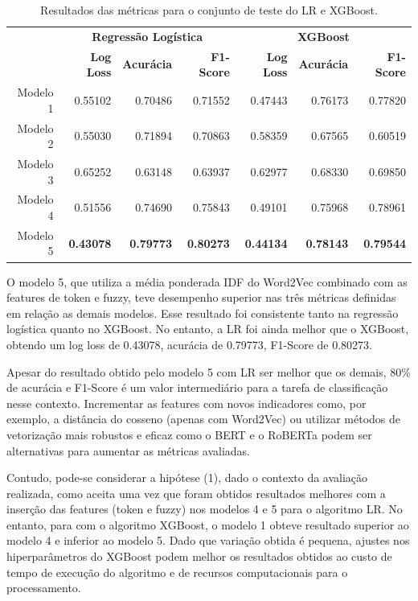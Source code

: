 \documentclass[conference]{IEEEtran}
\begin{document}
\begin{table}
\captionsetup{}
\caption{Resultados das métricas para o conjunto de teste do LR e XGBoost.} \label{tab:freq}
\setlength\tabcolsep{0pt} 
\footnotesize\centering
\centering
\begin{tabular*}{\textwidth}{@{\extracolsep{\stretch{1}}}*{7}{r}@{}}
  \toprule
   & \multicolumn{3}{c}{{\textbf{Regressão Logística}}}  &  \multicolumn{3}{c}{{\textbf{XGBoost}}} \\
   \cmidrule(lr){2-4}\cmidrule(l){5-7}
   & \textbf{Log Loss} & \textbf{Acurácia} & \textbf{F1-Score} & \textbf{Log Loss} & \textbf{Acurácia} & \textbf{F1-Score} \\
  \midrule
    Modelo 1 & 0.55102 & 0.70486 & 0.71552 & 0.47443 & 0.76173 & 0.77820 \\ 
    Modelo 2 & 0.55030 & 0.71894 & 0.70863 & 0.58359 & 0.67565 & 0.60519 \\
    Modelo 3 & 0.65252 & 0.63148 & 0.63937 & 0.62977 & 0.68330 & 0.69850 \\
    Modelo 4 & 0.51556 & 0.74690 & 0.75843 & 0.49101 & 0.75968 & 0.78961 \\
    Modelo 5 & \textbf{0.43078} & \textbf{0.79773} & \textbf{0.80273} & \textbf{0.44134} & \textbf{0.78143} & \textbf{0.79544} \\
  \hline       
  \bottomrule
\end{tabular*}
\end{table}


O modelo 5, que utiliza a média ponderada IDF do Word2Vec combinado com as features de token e fuzzy, teve desempenho superior nas três métricas definidas em relação as demais modelos. Esse resultado foi consistente tanto na regressão logística quanto no XGBoost. No entanto, a LR foi ainda melhor que o XGBoost, obtendo um log loss de 0.43078, acurácia de 0.79773, F1-Score de 0.80273. 

Apesar do resultado obtido pelo modelo 5 com LR ser melhor que os demais, 80\% de acurácia e F1-Score é um valor intermediário para a tarefa de classificação nesse contexto. Incrementar as features com novos indicadores como, por exemplo, a distância do cosseno (apenas com Word2Vec) ou utilizar métodos de vetorização mais robustos e eficaz como o BERT \cite{BERT2019} e o RoBERTa \cite{RoBERTa2019} podem ser alternativas para aumentar as métricas avaliadas.

Contudo, pode-se considerar a hipótese (1), dado o contexto da avaliação realizada, como aceita uma vez que foram obtidos resultados melhores com a inserção das features (token e fuzzy) nos modelos 4 e 5 para o algoritmo LR.
No entanto, para com o algoritmo XGBoost, o modelo 1 obteve resultado superior ao modelo 4 e inferior ao modelo 5. Dado que variação obtida é pequena, ajustes nos hiperparâmetros do XGBoost podem melhor os resultados obtidos ao custo de tempo de execução do algoritmo e de recursos computacionais para o processamento.
\end{document}
